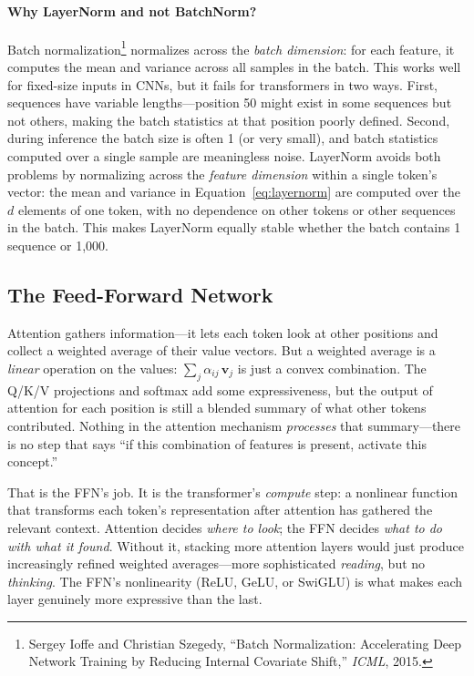 \paragraph{Why LayerNorm and not BatchNorm?}
Batch normalization\footnote{Sergey Ioffe and Christian Szegedy, ``Batch Normalization: Accelerating Deep Network Training by Reducing Internal Covariate Shift,'' \emph{ICML}, 2015.} normalizes across the \emph{batch dimension}: for each feature, it computes the mean and variance across all samples in the batch. This works well for fixed-size inputs in CNNs, but it fails for transformers in two ways. First, sequences have variable lengths---position 50 might exist in some sequences but not others, making the batch statistics at that position poorly defined. Second, during inference the batch size is often 1 (or very small), and batch statistics computed over a single sample are meaningless noise. LayerNorm avoids both problems by normalizing across the \emph{feature dimension} within a single token's vector: the mean and variance in Equation~\ref{eq:layernorm} are computed over the $d$ elements of one token, with no dependence on other tokens or other sequences in the batch. This makes LayerNorm equally stable whether the batch contains 1 sequence or 1,000.

\subsection{The Feed-Forward Network}
\label{sec:ffn}

%
Attention gathers information---it lets each token look at other positions and collect a weighted average of their value vectors. But a weighted average is a \emph{linear} operation on the values: $\sum_j \alpha_{ij}\,\mathbf{v}_j$ is just a convex combination. The Q/K/V projections and softmax add some expressiveness, but the output of attention for each position is still a blended summary of what other tokens contributed. Nothing in the attention mechanism \emph{processes} that summary---there is no step that says ``if this combination of features is present, activate this concept.''

That is the FFN's job. It is the transformer's \emph{compute} step: a nonlinear function that transforms each token's representation after attention has gathered the relevant context. Attention decides \emph{where to look}; the FFN decides \emph{what to do with what it found}. Without it, stacking more attention layers would just produce increasingly refined weighted averages---more sophisticated \emph{reading}, but no \emph{thinking}. The FFN's nonlinearity (ReLU, GeLU, or SwiGLU) is what makes each layer genuinely more expressive than the last.

